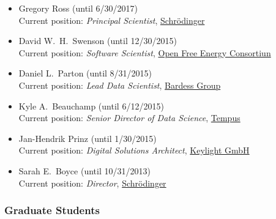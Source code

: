 \documentclass[10pt]{article}
\begin{document}
\begin{itemize}
  \item Gregory Ross (until 6/30/2017)\\
  Current position: \emph{Principal Scientist}, \href{http://www.schrodinger.com}{{ Schr\"{o}dinger}}
  
  \item David W.~H.~Swenson (until 12/30/2015)\\
  Current position: \emph{Software Scientist}, \href{http://openfree.energy}{Open Free Energy Consortiun}
  
  \item Daniel L.~Parton (until 8/31/2015)\\
  Current position: \emph{Lead Data Scientist}, \href{http://www.bardess.com/}{{Bardess Group}}
  
  \item Kyle A.~Beauchamp (until 6/12/2015)\\
  Current position: \emph{Senior Director of Data Science}, \href{http://www.tempus.com}{{Tempus}}
  
  \item Jan-Hendrik Prinz (until 1/30/2015)\\
  Current position: \emph{Digital Solutions Architect}, \href{http://www.keylight.de/}{{Keylight GmbH}}
  
  \item Sarah E.~Boyce (until 10/31/2013)\\
  Current position: \emph{Director},  \href{http://www.schrodinger.com}{{Schr\"{o}dinger}}

\end{itemize}

\subsubsection*{Graduate Students}
\end{document}
